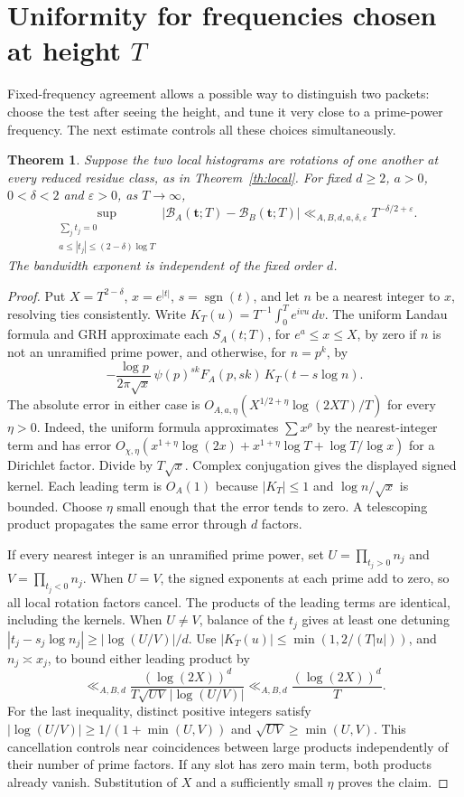 \documentclass[11pt,letterpaper]{article}
\newtheorem{theorem}{Theorem}
\newcommand{\eps}{\varepsilon}
\newcommand{\cB}{\mathcal B}
\begin{document}
\section{Uniformity for frequencies chosen at height \texorpdfstring{$T$}{T}}\label{sec:uniform}
Fixed-frequency agreement allows a possible way to distinguish two packets: choose the test after seeing the height, and tune it very close to a prime-power frequency. The next estimate controls all these choices simultaneously.
\begin{theorem}\label{th:uniform}
Suppose the two local histograms are rotations of one another at every reduced residue class, as in Theorem~\ref{th:local}. For fixed $d\ge2$, $a>0$, $0<\delta<2$ and $\eps>0$, as $T\to\infty$,
\[
 \sup_{\substack{\sum_j t_j=0\\ a\le |t_j|\le (2-\delta)\log T}}
 |\cB_A(\mathbf t;T)-\cB_B(\mathbf t;T)|
   \ll_{A,B,d,a,\delta,\eps} T^{-\delta/2+\eps}.
\]
The bandwidth exponent is independent of the fixed order $d$.
\end{theorem}
\begin{proof}
Put $X=T^{2-\delta}$, $x=e^{|t|}$, $s=\operatorname{sgn}(t)$, and let $n$ be a nearest integer to $x$, resolving ties consistently. Write $K_T(u)=T^{-1}\int_0^T e^{ivu}\,dv$. The uniform Landau formula \cite[Lemma 2.1]{FZ} and GRH approximate each $S_A(t;T)$, for $e^a\le x\le X$, by zero if $n$ is not an unramified prime power, and otherwise, for $n=p^k$, by
\begin{equation}
 -\frac{\log p}{2\pi\sqrt x}\,\psi(p)^{sk} F_A(p,sk)\, K_T(t-s\log n). \label{eq:sinc}
\end{equation}
The absolute error in either case is
$O_{A,a,\eta}(X^{1/2+\eta}\log(2XT)/T)$ for every $\eta>0$. Indeed, the uniform formula approximates $\sum x^\rho$ by the nearest-integer term and has error
$O_{\chi,\eta}(x^{1+\eta}\log(2x)+x^{1+\eta}\log T+\log T/\log x)$ for a Dirichlet factor. Divide by $T\sqrt x$. Complex conjugation gives the displayed signed kernel. Each leading term is $O_A(1)$ because $|K_T|\le1$ and $\log n/\sqrt{x}$ is bounded. Choose $\eta$ small enough that the error tends to zero. A telescoping product propagates the same error through $d$ factors.

If every nearest integer is an unramified prime power, set $U=\prod_{t_j>0} n_j$ and $V=\prod_{t_j<0} n_j$. When $U=V$, the signed exponents at each prime add to zero, so all local rotation factors cancel. The products of the leading terms are identical, including the kernels. When $U\ne V$, balance of the $t_j$ gives at least one detuning $|t_j-s_j\log n_j|\ge|\log(U/V)|/d$. Use $|K_T(u)|\le\min(1,2/(T|u|))$, and $n_j\asymp x_j$, to bound either leading product by
\[
 \ll_{A,B,d}\frac{(\log(2X))^d}{T\sqrt{UV}\,|\log(U/V)|}
 \ll_{A,B,d}\frac{(\log(2X))^d}{T}.
\]
For the last inequality, distinct positive integers satisfy
$|\log(U/V)|\ge1/(1+\min(U,V))$ and $\sqrt{UV}\ge\min(U,V)$. This cancellation controls near coincidences between large products independently of their number of prime factors. If any slot has zero main term, both products already vanish. Substitution of $X$ and a sufficiently small $\eta$ proves the claim.
\end{proof}
\end{document}
